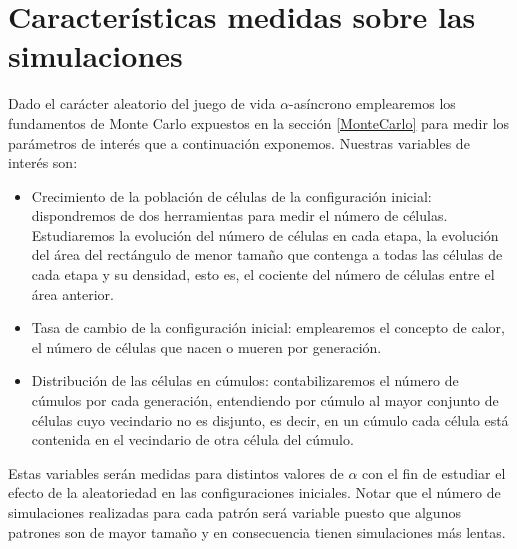 \documentclass[../proyecto.tex]{memoir}
\begin{document}
\section{Características medidas sobre las simulaciones}

Dado el carácter aleatorio del juego de vida $\alpha$-asíncrono emplearemos los fundamentos de Monte Carlo expuestos en la sección \ref{MonteCarlo} para medir los parámetros de interés que a continuación exponemos. Nuestras variables de interés son:

\begin{itemize}
\item Crecimiento de la población de células de la configuración inicial: dispondremos de dos herramientas para medir el número de células. Estudiaremos la evolución del número de células en cada etapa, la evolución del área del rectángulo de menor tamaño que contenga a todas las células de cada etapa y su densidad, esto es, el cociente del número de células entre el área anterior.
\item Tasa de cambio de la configuración inicial: emplearemos el concepto de calor, el número de células que nacen o mueren por generación.
\item Distribución de las células en cúmulos: contabilizaremos el número de cúmulos por cada generación, entendiendo por cúmulo al mayor conjunto de células cuyo vecindario no es disjunto, es decir, en un cúmulo cada célula está contenida en el vecindario de otra célula del cúmulo.
\end{itemize}

Estas variables serán medidas para distintos valores de $\alpha$ con el fin de estudiar el efecto de la aleatoriedad en las configuraciones iniciales. Notar que el número de simulaciones realizadas para cada patrón será variable puesto que algunos patrones son de mayor tamaño y en consecuencia tienen simulaciones más lentas.

\end{document}

